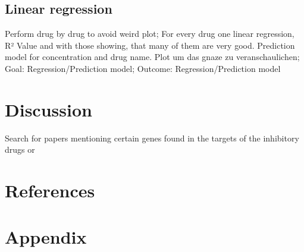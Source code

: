 \documentclass[
  11pt,
]{article}
\begin{document}
\hypertarget{linear-regression}{%
\subsection{Linear regression}\label{linear-regression}}

Perform drug by drug to avoid weird plot; For every drug one linear
regression, R² Value and with those showing, that many of them are very
good. Prediction model for concentration and drug name. Plot um das
gnaze zu veranschaulichen; Goal: Regression/Prediction model; Outcome:
Regression/Prediction model

\hypertarget{discussion}{%
\section{Discussion}\label{discussion}}

Search for papers mentioning certain genes found in the targets of the
inhibitory drugs or

\hypertarget{references}{%
\section{References}\label{references}}

\hypertarget{appendix}{%
\section{Appendix}\label{appendix}}
\end{document}
